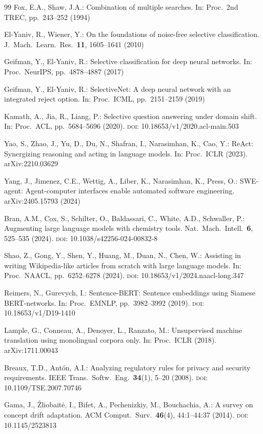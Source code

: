 \documentclass{sn-jnl}
\begin{document}
\begin{thebibliography}{99}
Fox, E.A., Shaw, J.A.: Combination of multiple searches. In: Proc.\ 2nd TREC, pp.\ 243--252 (1994)

El-Yaniv, R., Wiener, Y.: On the foundations of noise-free selective classification. J.\ Mach.\ Learn.\ Res.\ \textbf{11}, 1605--1641 (2010)

Geifman, Y., El-Yaniv, R.: Selective classification for deep neural networks. In: Proc.\ NeurIPS, pp.\ 4878--4887 (2017)

Geifman, Y., El-Yaniv, R.: SelectiveNet: A deep neural network with an integrated reject option. In: Proc.\ ICML, pp.\ 2151--2159 (2019)

Kamath, A., Jia, R., Liang, P.: Selective question answering under domain shift. In: Proc.\ ACL, pp.\ 5684--5696 (2020). \textsc{doi}: 10.18653/v1/2020.acl-main.503

Yao, S., Zhao, J., Yu, D., Du, N., Shafran, I., Narasimhan, K., Cao, Y.: ReAct: Synergizing reasoning and acting in language models. In: Proc.\ ICLR (2023). arXiv:2210.03629

Yang, J., Jimenez, C.E., Wettig, A., Liber, K., Narasimhan, K., Press, O.: SWE-agent: Agent-computer interfaces enable automated software engineering. arXiv:2405.15793 (2024)

Bran, A.M., Cox, S., Schilter, O., Baldassari, C., White, A.D., Schwaller, P.: Augmenting large language models with chemistry tools. Nat.\ Mach.\ Intell.\ \textbf{6}, 525--535 (2024). \textsc{doi}: 10.1038/s42256-024-00832-8

Shao, Z., Gong, Y., Shen, Y., Huang, M., Duan, N., Chen, W.: Assisting in writing Wikipedia-like articles from scratch with large language models. In: Proc.\ NAACL, pp.\ 6252--6278 (2024). \textsc{doi}: 10.18653/v1/2024.naacl-long.347

Reimers, N., Gurevych, I.: Sentence-BERT: Sentence embeddings using Siamese BERT-networks. In: Proc.\ EMNLP, pp.\ 3982--3992 (2019). \textsc{doi}: 10.18653/v1/D19-1410

Lample, G., Conneau, A., Denoyer, L., Ranzato, M.: Unsupervised machine translation using monolingual corpora only. In: Proc.\ ICLR (2018). arXiv:1711.00043

Breaux, T.D., Ant\'on, A.I.: Analyzing regulatory rules for privacy and security requirements. IEEE Trans.\ Softw.\ Eng.\ \textbf{34}(1), 5--20 (2008). \textsc{doi}: 10.1109/TSE.2007.70746

Gama, J., \v{Z}liobait\.{e}, I., Bifet, A., Pechenizkiy, M., Bouchachia, A.: A survey on concept drift adaptation. ACM Comput.\ Surv.\ \textbf{46}(4), 44:1--44:37 (2014). \textsc{doi}: 10.1145/2523813

\end{thebibliography}
\end{document}
